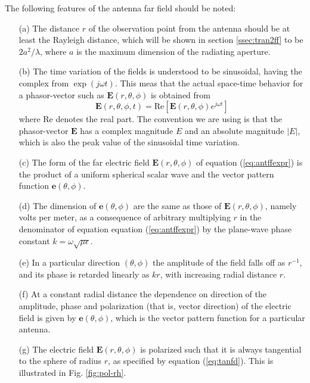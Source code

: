 The following features of the antenna far field should be noted:
\begin{itemize}
	\item [(a)]
	The distance $r$ of the observation point from the antenna should be at least the Rayleigh distance, which will be shown in section \ref{ssec:tran2ff} to be $2a^2/\lambda$, where $a$ is the maximum dimension of the radiating aperture.
	\item [(b)]
	The time variation of the fields is understood to be sinusoidal, having the complex from $\exp(j\omega t)$. This meas that the actual space-time behavior for a phasor-vector such as $\mathbf{E}(r,\theta,\phi)$ is obtained from
	\begin{equation}
	\mathbf{E}(r,\theta,\phi,t)=\text{Re}[\mathbf{E}(r,\theta,\phi)e^{j\omega t}]
	\end{equation}
	where Re denotes the real part. The convention we are using is that the phasor-vector $\mathbf{E}$ has a complex magnitude $E$ and an absolute magnitude $|E|$, which is also the peak value of the sinusoidal time variation.
	\item [(c)]
	The form of the far electric field $\mathbf{E}(r,\theta,\phi)$ of equation (\ref{eq:antffexpr}) is the product of a uniform spherical scalar wave and the vector pattern function $\mathbf{e}(\theta,\phi)$.
	\item [(d)]
	The dimension of $\mathbf{e}(\theta, \phi)$ are the same as those of $\mathbf{E}(r,\theta,\phi)$, namely volts per meter, as a consequence of arbitrary multiplying $r$ in the denominator of equation equation (\ref{eq:antffexpr}) by the plane-wave phase constant $k=\omega \sqrt{\mu \epsilon}$.
	\item [(e)]
	In a particular direction $(\theta,\phi)$ the amplitude of the field falls off as $r^{-1}$, and its phase is retarded linearly as $kr$, with increasing radial distance $r$.
	\item [(f)]
	At a constant radial distance the dependence on direction of the amplitude, phase and polarization (that is, vector direction) of the electric field is given by $\mathbf{e}(\theta,\phi)$, which is the vector pattern function for a particular antenna.
	\item [(g)]
	The electric field $\mathbf{E}(r,\theta,\phi)$ is polarized such that it is always tangential to the sphere of radius $r$, as specified by equation (\ref{eq:tanfd}). This is illustrated in Fig. \ref{fig:pol-rh}.
	\begin{figure}[htbp]
		\begin{center}

\end{center}
\end{figure}
\end{itemize}
